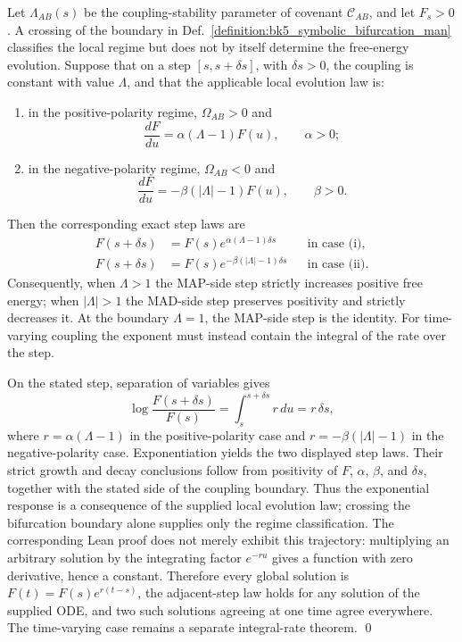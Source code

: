 \begin{proposition}
\label{proposition:bk5_transactional_covenant_dynamics}
Let $\Lambda_{AB}(s)$ be the coupling-stability parameter of covenant
$\mathcal{C}_{AB}$, and let $F_s>0$.  A crossing of the boundary in
Def.~\ref{definition:bk5_symbolic_bifurcation_man} classifies the local regime
but does not by itself determine the free-energy evolution.  Suppose that on a
step $[s,s+\delta s]$, with $\delta s>0$, the coupling is constant with value
$\Lambda$, and that the applicable local evolution law is:
\begin{enumerate}
  \item[(i)] in the positive-polarity regime, $\Omega_{AB}>0$ and
  \begin{equation}
  \frac{dF}{du}=\alpha(\Lambda-1)F(u), \qquad \alpha>0;
  \end{equation}
  \item[(ii)] in the negative-polarity regime, $\Omega_{AB}<0$ and
  \begin{equation}
  \frac{dF}{du}=-\beta(|\Lambda|-1)F(u), \qquad \beta>0.
  \end{equation}
\end{enumerate}
Then the corresponding exact step laws are
\begin{align}
F(s+\delta s)&=F(s)e^{\alpha(\Lambda-1)\delta s}
  &&\text{in case (i)},\\
F(s+\delta s)&=F(s)e^{-\beta(|\Lambda|-1)\delta s}
  &&\text{in case (ii)}.
\end{align}
Consequently, when $\Lambda>1$ the MAP-side step strictly increases positive
free energy; when $|\Lambda|>1$ the MAD-side step preserves positivity and
strictly decreases it.  At the boundary $\Lambda=1$, the MAP-side step is the
identity.  For time-varying coupling the exponent must instead contain the
integral of the rate over the step.
\end{proposition}
\begin{demonstratio}
\label{demonstratio:bk5_transitory_phasing}
On the stated step, separation of variables gives
\begin{equation}
\log\!\frac{F(s+\delta s)}{F(s)}
  =\int_s^{s+\delta s} r\,du=r\,\delta s,
\end{equation}
where $r=\alpha(\Lambda-1)$ in the positive-polarity case and
$r=-\beta(|\Lambda|-1)$ in the negative-polarity case.  Exponentiation yields
the two displayed step laws.  Their strict growth and decay conclusions follow
from positivity of $F$, $\alpha$, $\beta$, and $\delta s$, together with the
stated side of the coupling boundary.  Thus the exponential response is a
consequence of the supplied local evolution law; crossing the bifurcation
boundary alone supplies only the regime classification.  The corresponding
Lean proof does not merely exhibit this trajectory: multiplying an arbitrary
solution by the integrating factor $e^{-ru}$ gives a function with zero
derivative, hence a constant.  Therefore every global solution is
$F(t)=F(s)e^{r(t-s)}$, the adjacent-step law holds for any solution of the
supplied ODE, and two such solutions agreeing at one time agree everywhere.
The time-varying case remains a separate integral-rate theorem. \qed
\end{demonstratio}
